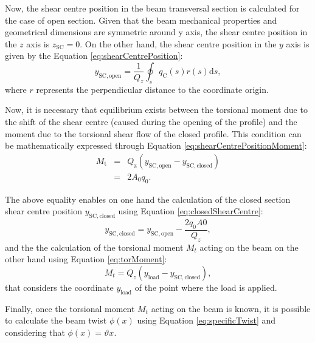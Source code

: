   Now, the shear centre position in the beam transversal section is calculated for the case of open section. Given that the beam mechanical properties and geometrical dimensions are symmetric around y axis, the shear centre position in the $z$ axis is $z_{\mathrm{SC}} = 0$. On the other hand, the shear centre position in the $y$ axis is given by the Equation \ref{eq:shearCentrePosition}:
  \begin{equation}\label{eq:shearCentrePosition}
    y_{\mathrm{SC,open}} = \frac{1}{Q_z} \oint_s q_\mathrm{C}(s) r(s) \mathrm{d}s,
  \end{equation}
  where $r$ represents the perpendicular distance to the coordinate origin.

  Now, it is necessary that equilibrium exists between the torsional moment due to the shift of the shear centre (caused during the opening of the profile) and the moment due to the torsional shear flow of the closed profile. This condition can be mathematically expressed through Equation \ref{eq:shearCentrePositionMoment}:
  \begin{eqnarray}\label{eq:shearCentrePositionMoment}
    M_\mathrm{t} &=& Q_\mathrm{z} (y_{\mathrm{SC,open}} - y_{\mathrm{SC,closed}}) \nonumber \\
    &=& 2 A_0 q_0.
  \end{eqnarray}

  The above equality enables on one hand the calculation of the closed section shear centre position $y_{\mathrm{SC,closed}}$ using Equation \ref{eq:closedShearCentre}:
  \begin{equation} \label{eq:closedShearCentre}
    y_{\mathrm{SC,closed}} = y_{\mathrm{SC,open}} - \frac{2 q_0 A0}{Q_z},
  \end{equation}
  and the the calculation of the torsional moment $M_t$ acting on the beam on the other hand using Equation \ref{eq:torMoment}:
  \begin{equation} \label{eq:torMoment}
    M_t = Q_z (y_{\mathrm{load}} - y_{\mathrm{SC,closed}}),
  \end{equation}
  that considers the coordinate $y_{\mathrm{load}}$ of the point where the load is applied.

  Finally, once the torsional moment $M_t$ acting on the beam is known, it is possible to calculate the beam twist $\phi(x)$ using Equation \ref{eq:specificTwist} and considering that $\phi(x) = \vartheta x$.

